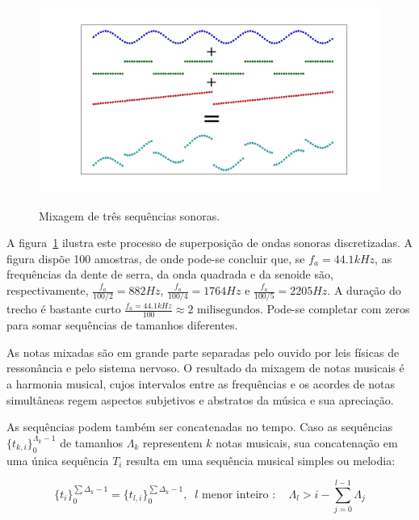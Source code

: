 \begin{figure}[h!]
    {\centering
        \includegraphics[width=\textwidth]{figuras/mixagem}}
    \caption{Mixagem de três sequências sonoras. }

        \label{fig:mixagem}
\end{figure}


A figura~\ref{fig:mixagem} ilustra este processo de superposição de ondas sonoras discretizadas. A figura dispõe 100 amostras, de onde pode-se concluir que, se $f_a=44.1kHz$, as frequências da dente de serra, da onda quadrada e da senoide são,
respectivamente, $\frac{f_a}{100/2}=882Hz$, $\frac{f_a}{100/4}=1764Hz$ e $\frac{f_a}{100/5}=2205Hz$. A duração do trecho é bastante curto $\frac{f_a=44.1kHz}{100} \approx 2 \text{ milisegundos}$. Pode-se completar com zeros para somar sequências de tamanhos diferentes. 

As notas mixadas são em grande parte separadas pelo ouvido por leis físicas de ressonância e pelo sistema nervoso.\cite{Roederer} O resultado da mixagem de notas musicais é a harmonia musical, cujos intervalos entre as frequências e os acordes de notas simultâneas regem aspectos subjetivos e abstratos da música e sua apreciação.\cite{Harmonia} 

As sequências podem também ser concatenadas no tempo. Caso as sequências $\{t_{k,i}\}_0^{\Lambda_k-1}$ de tamanhos $\Lambda_k$  representem $k$ notas musicais, sua concatenação em uma única sequência $T_i$ resulta em uma sequência musical simples ou melodia:

\begin{equation}\label{eq:concatenacao}
\{t_i\}_0^{\sum\Delta_k-1}=\{t_{l,i}\}_0^{\sum\Delta_k-1}, \;\; l\text{ menor inteiro } : \quad \Lambda_l > i -\sum_{j=0}^{l-1}\Lambda_j
\end{equation}

